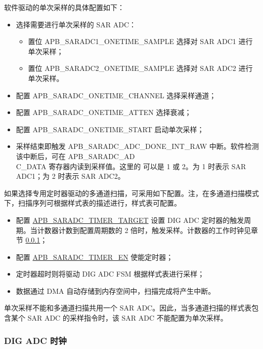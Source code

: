 \documentclass[main\_\_CN.tex]{subfiles}
\begin{document}
软件驱动的单次采样的具体配置如下：
\begin{itemize}
    \item 选择需要进行单次采样的 SAR ADC：
    \begin{itemize}
        \item 置位 APB\_SARADC1\_ONETIME\_SAMPLE 选择对 SAR ADC1 进行单次采样；
        \item 置位 APB\_SARADC2\_ONETIME\_SAMPLE 选择对 SAR ADC2 进行单次采样。
    \end{itemize}
    \item 配置 APB\_SARADC\_ONETIME\_CHANNEL 选择采样通道；
    \item 配置 APB\_SARADC\_ONETIME\_ATTEN 选择衰减；
    \item 配置 APB\_SARADC\_ONETIME\_START 启动单次采样；
    \item 采样结束即触发 APB\_SARADC\_ADC\_DONE\_INT\_RAW 中断。软件检测该中断后，可在 APB\_SARADC\_AD\\C{}\_DATA 寄存器内读到采样值。这里的  可以是 1 或 2。为 1 时表示 SAR ADC1；为 2 时表示 SAR ADC2。 
\end{itemize}

如果选择专用定时器驱动的多通道扫描，可采用如下配置。注，在多通道扫描模式下，扫描序列可根据样式表的描述进行，样式表可配置。 
\begin{itemize} 
        \item 配置 \hyperref[fielddesc:APBSARADCSARADCTIMERTARGET]{APB\_SARADC\_TIMER\_TARGET} 设置 DIG ADC 定时器的触发周期。当计数器计数到配置周期数的 2 倍时，触发采样。计数器的工作时钟见章节 \ref{other:sensor-para-dig-adc-clock}；
        \item 配置 \hyperref[fielddesc:APBSARADCSARADCTIMEREN]{APB\_SARADC\_TIMER\_EN} 使能定时器；
        \item 定时器超时则将驱动 DIG ADC FSM 根据样式表进行采样；
        \item 数据通过 DMA 自动存储到内存空间中，扫描完成将产生中断。
\end{itemize}

\begin{tiplisting}
单次采样不能和多通道扫描共用一个 SAR ADC。因此，当多通道扫描的样式表包含某个 SAR ADC 的采样指令时，该 SAR ADC 不能配置为单次采样。
\end{tiplisting}

\subsubsection{DIG ADC 时钟}\label{other:sensor-para-dig-adc-clock}
\end{document}

